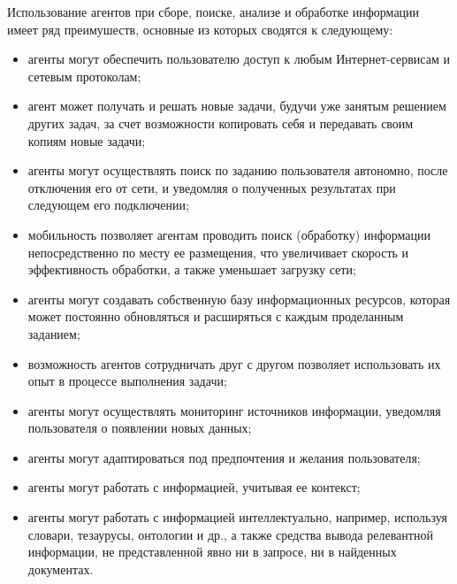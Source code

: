 Использование агентов при сборе, поиске, анализе и обработке информации имеет ряд преимушеств, основные из которых сводятся к следующему:
\begin{itemize}
\item агенты могут обеспечить пользователю доступ к любым Интернет-сервисам и сетевым протоколам;
\item агент может получать и решать новые задачи, будучи уже занятым решением других задач, за счет возможности копировать себя и передавать своим копиям новые задачи;
\item агенты могут осуществлять поиск по заданию пользователя автономно, после отключения его от сети, и уведомляя о полученных результатах при следующем его подключении;
\item мобильность позволяет агентам проводить поиск (обработку) информации непосредственно по месту ее размещения, что увеличивает скорость и эффективность обработки, а также уменьшает загрузку сети;
\item агенты могут создавать собственную базу информационных ресурсов, которая может постоянно обновляться и расширяться с каждым проделанным заданием;
\item возможность агентов сотрудничать друг с другом позволяет использовать их опыт в процессе выполнения задачи;
\item агенты могут осуществлять мониторинг источников информации, уведомляя пользователя о появлении новых данных;
\item агенты могут адаптироваться под предпочтения и желания пользователя;
\item агенты могут работать с информацией, учитывая ее контекст;
\item агенты могут работать с информацией интеллектуально, например, используя словари, тезаурусы, онтологии и др., а также средства вывода релевантной информации, не представленной явно ни в запросе, ни в найденных документах.
\end{itemize}

